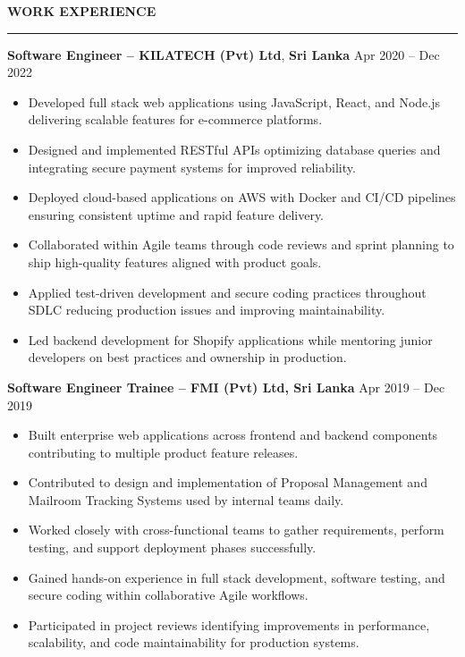 \documentclass[10pt,letterpaper]{article}
\begin{document}
\vspace{8pt}

\textbf{WORK EXPERIENCE}\\[-8pt]
\noindent\rule{\textwidth}{1pt}

\vspace{-2pt}

\textbf{Software Engineer -- KILATECH (Pvt) Ltd}, \textbf{Sri Lanka} \hfill Apr 2020 -- Dec 2022

\vspace{-1pt}

\begin{itemize}
\item Developed full stack web applications using JavaScript, React, and Node.js delivering scalable features for e-commerce platforms.
\item Designed and implemented RESTful APIs optimizing database queries and integrating secure payment systems for improved reliability.
\item Deployed cloud-based applications on AWS with Docker and CI/CD pipelines ensuring consistent uptime and rapid feature delivery.
\item Collaborated within Agile teams through code reviews and sprint planning to ship high-quality features aligned with product goals.
\item Applied test-driven development and secure coding practices throughout SDLC reducing production issues and improving maintainability.
\item Led backend development for Shopify applications while mentoring junior developers on best practices and ownership in production.
\end{itemize}

\textbf{Software Engineer Trainee -- FMI (Pvt) Ltd, Sri Lanka} \hfill Apr 2019 -- Dec 2019

\vspace{-1pt}

\begin{itemize}
\item Built enterprise web applications across frontend and backend components contributing to multiple product feature releases.
\item Contributed to design and implementation of Proposal Management and Mailroom Tracking Systems used by internal teams daily.
\item Worked closely with cross-functional teams to gather requirements, perform testing, and support deployment phases successfully.
\item Gained hands-on experience in full stack development, software testing, and secure coding within collaborative Agile workflows.
\item Participated in project reviews identifying improvements in performance, scalability, and code maintainability for production systems.
\end{itemize}
\end{document}
